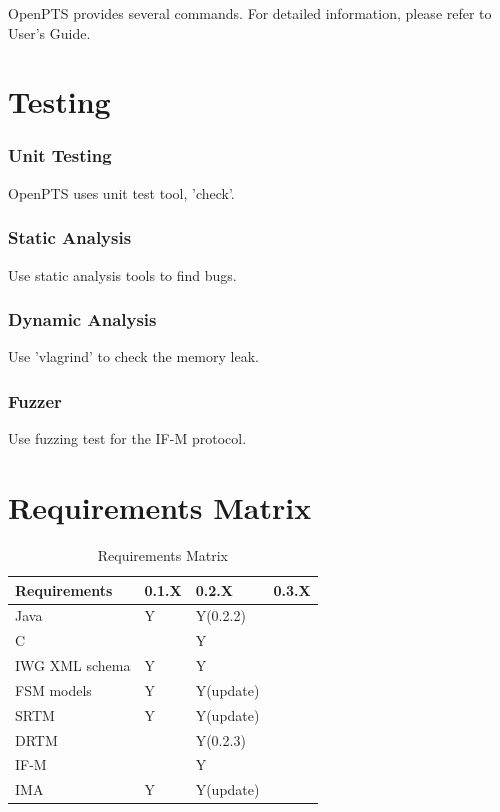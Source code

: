 \documentclass[12pt,a4paper]{article}
\begin{document}
OpenPTS provides several commands. 
For detailed information, please refer to User's Guide.


\section{Testing}

\subsubsection{Unit Testing}

OpenPTS uses unit test tool, 'check'.

\subsubsection{Static Analysis}

Use static analysis tools to find bugs.

\subsubsection{Dynamic Analysis}

Use 'vlagrind' to check the memory leak. 

\subsubsection{Fuzzer}

Use fuzzing test for the IF-M protocol.


\clearpage 
\section{Requirements Matrix}


\begin{table}
\caption{Requirements Matrix}
\label{table:reqmatrix}
\begin{center}
\begin{tabular}{|l|l|l|l|}
	\hline
	Requirements & 0.1.X & 0.2.X & 0.3.X \\
	\hline 	\hline
	Java           & Y  & Y(0.2.2)  &   \\ \hline
	C              &    & Y         &   \\ \hline
	IWG XML schema & Y  & Y         &   \\ \hline
	FSM models     & Y  & Y(update) &   \\ \hline
    SRTM           & Y  & Y(update) &   \\ \hline
    DRTM           &    & Y(0.2.3)  &   \\ \hline
	IF-M           &    & Y         &   \\ \hline
	IMA            & Y  & Y(update) &   \\ \hline
\end{tabular}
\end{center}
\end{table}
\end{document}
